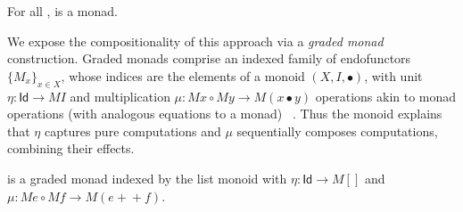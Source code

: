 \documentclass[preprint,sigplan]{acmart}
\begin{document}

\begin{proposition}
For all ,  is a monad.
\end{proposition}

We expose the compositionality of this approach via a
\emph{graded monad} construction.  Graded monads comprise an indexed
family of endofunctors $\{M_x\}_{x \in X}$, whose indices are the elements of a monoid
$(X, I, \bullet)$, with unit $\eta : \mathsf{Id} \rightarrow M I$ and
multiplication $\mu : M x \circ M y \rightarrow M (x \bullet y)$
operations akin to monad operations (with analogous equations to a
monad)
~\cite{DBLP:conf/popl/Katsumata14,DBLP:journals/corr/OrchardPM14}. Thus
the monoid explains that $\eta$ captures pure computations and $\mu$
sequentially composes computations, combining their effects.

\begin{proposition}
 is a graded monad indexed
by the list monoid with
$\eta : \mathsf{Id} \rightarrow M []$ and $\mu : M e \circ M f \rightarrow M (e +\!\!\!+ f)$.
\end{proposition}




\end{document}
